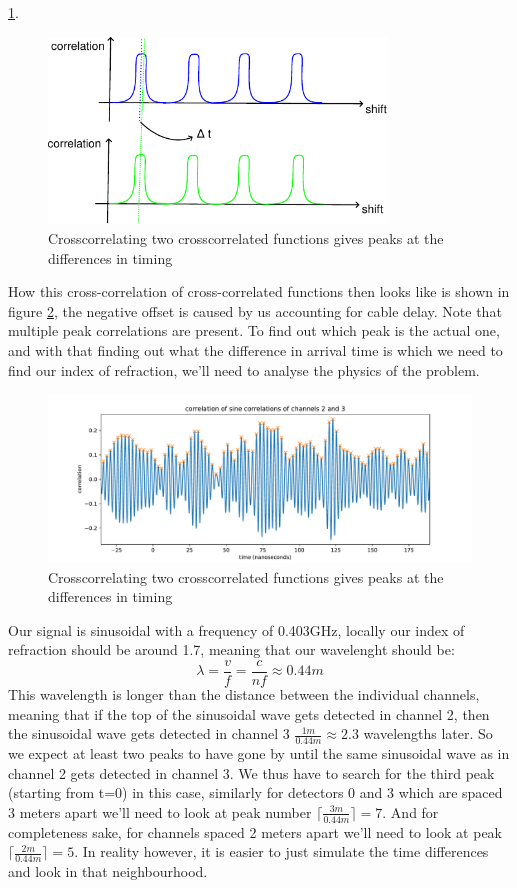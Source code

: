 \ref{fig:IlluCorr}. 
\begin{figure}
  \centering
\includegraphics[width=0.8\textwidth]{figures/IlluCorr.pdf}
\caption{Crosscorrelating two crosscorrelated functions gives peaks at the differences in timing}
	\label{fig:IlluCorr}
\end{figure}
How this cross-correlation of cross-correlated functions then looks like is shown
in figure \ref{fig:CrossCrossCorr}, the negative offset is caused by us accounting for cable
delay. Note that multiple peak correlations are present. To find out which peak
is the actual one, and with that finding out what the difference in arrival time is which we
need to find our index of refraction, we'll need to analyse the physics of the problem.
\begin{figure}
  \centering
  \includegraphics[width=\textwidth]{figures/CrossCrossCorr.pdf}
  \caption{Crosscorrelating two crosscorrelated functions gives peaks at the differences in timing}
	\label{fig:CrossCrossCorr}
\end{figure}

Our signal is sinusoidal with a frequency of 0.403GHz, locally our index of refraction should be around 1.7,
meaning that our wavelenght should be:
\begin{equation}
  \lambda = \frac{v}{f} = \frac{c}{nf} \approx 0.44m
\end{equation}
This wavelength is longer than the distance between the individual channels, meaning that if the top
of the sinusoidal wave gets detected in channel 2, then the sinusoidal wave gets detected in
channel 3 $\frac{1m}{0.44m} \approx 2.3$ wavelengths later. So we expect at least two peaks to 
have gone by until the same sinusoidal wave as in channel 2 gets detected in channel 3.
We thus have to search for the third peak (starting from t=0) in this case, similarly for detectors 0 and 3
which are spaced 3 meters apart we'll need to look at peak number $\lceil\frac{3m}{0.44m}\rceil = 7$.
And for completeness sake, for channels spaced 2 meters apart we'll need to look at peak 
$\lceil\frac{2m}{0.44m}\rceil = 5$. In reality however, it is easier to just simulate the time differences
and look in that neighbourhood.

